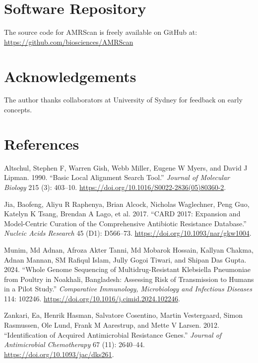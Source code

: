 \documentclass[
]{article}
\newlength{\cslhangindent}
\newenvironment{CSLReferences}[2] %
 {\begin{list}{}{%
  \setlength{\itemindent}{0pt}
  \setlength{\leftmargin}{0pt}
  \setlength{\parsep}{0pt}
  \ifodd #1
   \setlength{\leftmargin}{\cslhangindent}
   \setlength{\itemindent}{-1\cslhangindent}
  \fi
  \setlength{\itemsep}{#2\baselineskip}}}
 {\end{list}}
\begin{document}
\endgroup

\section{Software Repository}\label{software-repository}

The source code for AMRScan is freely available on GitHub at:\\
\url{https://github.com/biosciences/AMRScan}

\section{Acknowledgements}\label{acknowledgements}

The author thanks collaborators at University of Sydney for feedback on
early concepts.

\section*{References}\label{references}

\protect{}\label{refs}
\begin{CSLReferences}{1}{0}
Altschul, Stephen F, Warren Gish, Webb Miller, Eugene W Myers, and David
J Lipman. 1990. {``Basic Local Alignment Search Tool.''} \emph{Journal
of Molecular Biology} 215 (3): 403--10.
\url{https://doi.org/10.1016/S0022-2836(05)80360-2}.

Jia, Baofeng, Aliyu R Raphenya, Brian Alcock, Nicholas Waglechner, Peng
Guo, Katelyn K Tsang, Brendan A Lago, et al. 2017. {``CARD 2017:
Expansion and Model-Centric Curation of the Comprehensive Antibiotic
Resistance Database.''} \emph{Nucleic Acids Research} 45 (D1): D566--73.
\url{https://doi.org/10.1093/nar/gkw1004}.

Munim, Md Adnan, Afroza Akter Tanni, Md Mobarok Hossain, Kallyan Chakma,
Adnan Mannan, SM Rafiqul Islam, Jully Gogoi Tiwari, and Shipan Das
Gupta. 2024. {``Whole Genome Sequencing of Multidrug-Resistant
Klebsiella Pneumoniae from Poultry in Noakhali, Bangladesh: Assessing
Risk of Transmission to Humans in a Pilot Study.''} \emph{Comparative
Immunology, Microbiology and Infectious Diseases} 114: 102246.
\url{https://doi.org/10.1016/j.cimid.2024.102246}.

Zankari, Ea, Henrik Hasman, Salvatore Cosentino, Martin Vestergaard,
Simon Rasmussen, Ole Lund, Frank M Aarestrup, and Mette V Larsen. 2012.
{``Identification of Acquired Antimicrobial Resistance Genes.''}
\emph{Journal of Antimicrobial Chemotherapy} 67 (11): 2640--44.
\url{https://doi.org/10.1093/jac/dks261}.

\end{CSLReferences}
\end{document}
